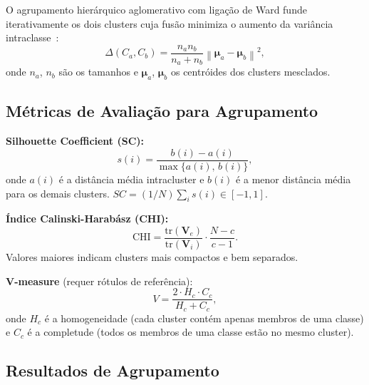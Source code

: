 \documentclass[12pt, a4paper]{article}
\newcommand{\bmu}{\boldsymbol{\mu}}
\newcommand{\norm}[1]{\left\lVert#1\right\rVert}
\begin{document}
O agrupamento hierárquico aglomerativo com ligação de Ward funde iterativamente os dois clusters cuja fusão minimiza o aumento da variância intraclasse~\cite{bishop2006}:
\begin{equation}
    \Delta(C_a, C_b) = \frac{n_a n_b}{n_a + n_b} \norm{\bmu_a - \bmu_b}^2,
    \label{eq:ward}
\end{equation}
onde $n_a$, $n_b$ são os tamanhos e $\bmu_a$, $\bmu_b$ os centróides dos clusters mesclados.

\subsection{Métricas de Avaliação para Agrupamento}
\label{sec:metricas_cluster}

\textbf{Silhouette Coefficient (SC):}
\begin{equation}
    s(i) = \frac{b(i) - a(i)}{\max\{a(i),\, b(i)\}},
    \label{eq:silhouette}
\end{equation}
onde $a(i)$ é a distância média intracluster e $b(i)$ é a menor distância média para os demais clusters. $SC = (1/N)\sum_i s(i) \in [-1, 1]$.

\textbf{Índice Calinski-Harabász (CHI):}
\begin{equation}
    \text{CHI} = \frac{\text{tr}(\mathbf{V}_e)}{\text{tr}(\mathbf{V}_i)} \cdot \frac{N - c}{c - 1}.
    \label{eq:chi}
\end{equation}
Valores maiores indicam clusters mais compactos e bem separados.

\textbf{V-measure} (requer rótulos de referência):
\begin{equation}
    V = \frac{2 \cdot H_c \cdot C_c}{H_c + C_c},
    \label{eq:vmeasure}
\end{equation}
onde $H_c$ é a homogeneidade (cada cluster contém apenas membros de uma classe) e $C_c$ é a completude (todos os membros de uma classe estão no mesmo cluster).

\subsection{Resultados de Agrupamento}
\label{sec:res_cluster}
\end{document}
